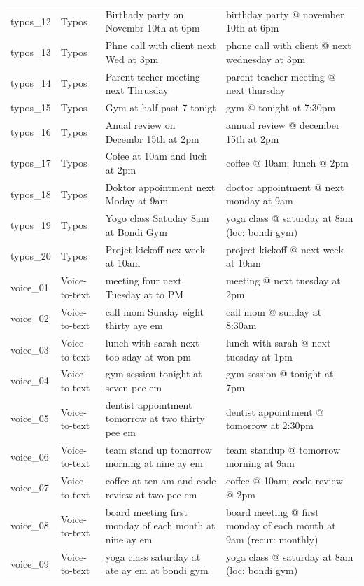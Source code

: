 \begin{longtable}{@{}p{2.2cm}p{2.1cm}p{5cm}p{5cm}@{}}
typos\_12 & Typos & Birthady party on Novembr 10th at 6pm & birthday party @ november 10th at 6pm \\
typos\_13 & Typos & Phne call with client next Wed at 3pm & phone call with client @ next wednesday at 3pm \\
typos\_14 & Typos & Parent-techer meeting next Thrusday & parent-teacher meeting @ next thursday \\
typos\_15 & Typos & Gym at half past 7 tonigt & gym @ tonight at 7:30pm \\
typos\_16 & Typos & Anual review on Decembr 15th at 2pm & annual review @ december 15th at 2pm \\
typos\_17 & Typos & Cofee at 10am and luch at 2pm & coffee @ 10am; lunch @ 2pm \\
typos\_18 & Typos & Doktor appointment next Moday at 9am & doctor appointment @ next monday at 9am \\
typos\_19 & Typos & Yogo class Satuday 8am at Bondi Gym & yoga class @ saturday at 8am (loc: bondi gym) \\
typos\_20 & Typos & Projet kickoff nex week at 10am & project kickoff @ next week at 10am \\
voice\_01 & Voice-to-text & meeting four next Tuesday at to PM & meeting @ next tuesday at 2pm \\
voice\_02 & Voice-to-text & call mom Sunday eight thirty aye em & call mom @ sunday at 8:30am \\
voice\_03 & Voice-to-text & lunch with sarah next too sday at won pm & lunch with sarah @ next tuesday at 1pm \\
voice\_04 & Voice-to-text & gym session tonight at seven pee em & gym session @ tonight at 7pm \\
voice\_05 & Voice-to-text & dentist appointment tomorrow at two thirty pee em & dentist appointment @ tomorrow at 2:30pm \\
voice\_06 & Voice-to-text & team stand up tomorrow morning at nine ay em & team standup @ tomorrow morning at 9am \\
voice\_07 & Voice-to-text & coffee at ten am and code review at two pee em & coffee @ 10am; code review @ 2pm \\
voice\_08 & Voice-to-text & board meeting first monday of each month at nine ay em & board meeting @ first monday of each month at 9am (recur: monthly) \\
voice\_09 & Voice-to-text & yoga class saturday at ate ay em at bondi gym & yoga class @ saturday at 8am (loc: bondi gym) \\

\end{longtable}
